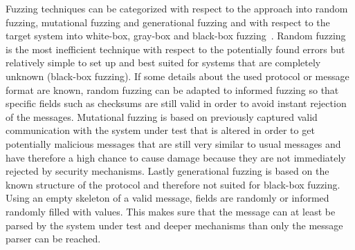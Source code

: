 Fuzzing techniques can be categorized with respect to the approach into random fuzzing, mutational fuzzing and generational fuzzing and with respect to the target system into white-box, gray-box and black-box fuzzing~\cite{neystadtPenTesting}. Random fuzzing is the most inefficient technique with respect to the potentially found errors but relatively simple to set up and best suited for systems that are completely unknown (black-box fuzzing). If some details about the used protocol or message format are known, random fuzzing can be adapted to informed fuzzing so that specific fields such as checksums are still valid in order to avoid instant rejection of the messages. Mutational fuzzing is based on previously captured valid communication with the system under test that is altered in order to get potentially malicious messages that are still very similar to usual messages and have therefore a high chance to cause damage because they are not immediately rejected by security mechanisms. Lastly generational fuzzing is based on the known structure of the protocol and therefore not suited for black-box fuzzing. Using an empty skeleton of a valid message, fields are randomly or informed randomly filled with values. This makes sure that the message can at least be parsed by the system under test and deeper mechanisms than only the message parser can be reached.
